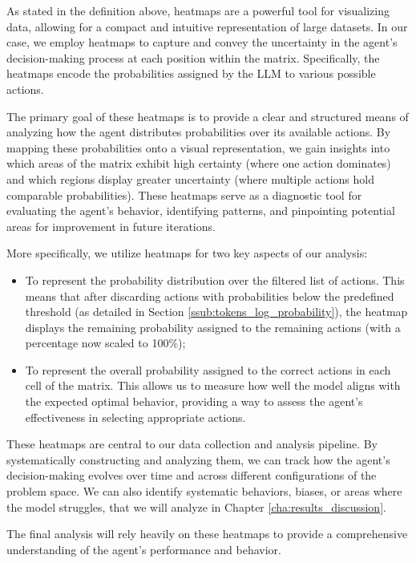 As stated in the definition above, heatmaps are a powerful tool for visualizing data,
allowing for a compact and intuitive representation of large datasets. In our case,
we employ heatmaps to capture and convey the uncertainty in the agent's decision-making
process at each position within the matrix. Specifically, the heatmaps encode
the probabilities assigned by the LLM to various possible actions.

The primary goal of these heatmaps is to provide a clear and structured means of
analyzing how the agent distributes probabilities over its available actions. By
mapping these probabilities onto a visual representation, we gain insights into
which areas of the matrix exhibit high certainty (where one action dominates)
and which regions display greater uncertainty (where multiple actions hold comparable
probabilities). These heatmaps serve as a diagnostic tool for evaluating the agent's
behavior, identifying patterns, and pinpointing potential areas for improvement in
future iterations.

More specifically, we utilize heatmaps for two key aspects of our analysis:

\begin{itemize}
  \item To represent the probability distribution over the filtered list of actions.
    This means that after discarding actions with probabilities below the
    predefined threshold (as detailed in Section \ref{ssub:tokens_log_probability}),
    the heatmap displays the remaining probability assigned to the remaining actions
    (with a percentage now scaled to 100\%);

  \item To represent the overall probability assigned to the correct actions in each
    cell of the matrix. This allows us to measure how well the model aligns with
    the expected optimal behavior, providing a way to assess the agent's effectiveness
    in selecting appropriate actions.
\end{itemize}

These heatmaps are central to our data collection and analysis pipeline. By
systematically constructing and analyzing them, we can track how the agent's decision-making
evolves over time and across different configurations of the problem space. We
can also identify systematic behaviors, biases, or areas where the model
struggles, that we will analyze in Chapter \ref{cha:results_discussion}.

The final analysis will rely heavily on these heatmaps to provide a comprehensive
understanding of the agent's performance and behavior.

